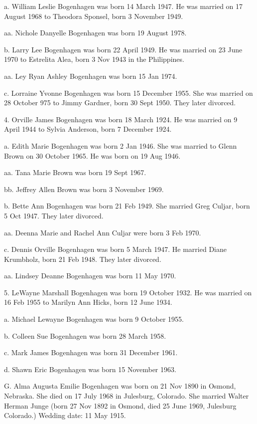 \documentclass[a4paper]{article}
\begin{document}
a. William Leslie Bogenhagen was born 14 March 1947.  He was married on 17 August 1968 to Theodora Sponsel, born 3 November 1949.
 
aa. Nichole Danyelle Bogenhagen was born 19 August 1978.

b. Larry Lee Bogenhagen was born 22 April 1949.  He was married on 23 June 1970 to Estrelita Alea, born 3 Nov 1943 in the Philippines.

aa. Ley Ryan Ashley Bogenhagen was born 15 Jan 1974.

c. Lorraine Yvonne Bogenhagen was born 15 December 1955.  She was married on 28 October 975 to Jimmy Gardner, born 30 Sept 1950. They later divorced.
 
4. Orville James Bogenhagen was born 18 March 1924.  He was married on 9 April 1944 to Sylvia Anderson, born 7 December 1924.
 
a. Edith Marie Bogenhagen was born 2 Jan 1946.  She was married to Glenn Brown on 30 October 1965.  He was born on 19 Aug 1946.

aa. Tana Marie Brown was born 19 Sept 1967.

bb. Jeffrey Allen Brown was born 3 November 1969.

b. Bette Ann Bogenhagen was born  21 Feb 1949.  She married Greg Culjar, born 5 Oct 1947.  They later divorced.

aa. Deenna Marie and Rachel Ann Culjar were born 3 Feb 1970.

c. Dennis Orville Bogenhagen was born 5 March 1947.  He married Diane Krumbholz, born 21 Feb 1948.  They later divorced.
 
aa. Lindsey Deanne Bogenhagen was born 11 May 1970.

5. LeWayne Marshall Bogenhagen was born 19 October 1932.  He was married on 16 Feb 1955 to Marilyn Ann Hicks, born 12 June 1934.
 
a. Michael Lewayne Bogenhagen was born 9 October 1955.

b. Colleen Sue Bogenhagen was born 28 March 1958.

c. Mark James Bogenhagen was born 31 December 1961.

d. Shawn Eric Bogenhagen was born 15 November 1963.  

G. Alma Augusta Emilie Bogenhagen was born on 21 Nov 1890 in Osmond, Nebraska. She died on 17 July 1968 in Julesburg, Colorado.  She married Walter Herman Junge (born 27 Nov 1892 in Osmond, died 25 June 1969, Julesburg Colorado.) Wedding date: 11 May 1915.
\end{document}
